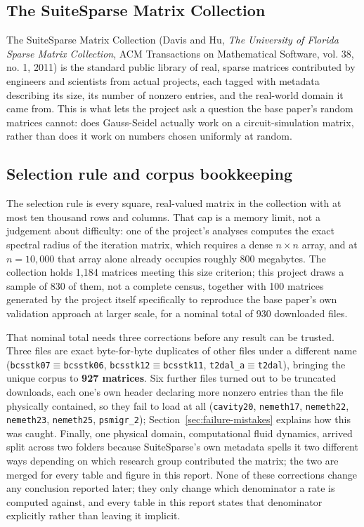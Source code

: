 \documentclass[11pt,a4paper]{article}
\newcommand{\code}[1]{\texttt{\footnotesize #1}}
\begin{document}
\subsection{The SuiteSparse Matrix Collection}
\label{sec:datasets-suitesparse}

The SuiteSparse Matrix Collection (Davis and Hu, \emph{The University of Florida Sparse
Matrix Collection}, ACM Transactions on Mathematical Software, vol. 38, no. 1, 2011) is
the standard public library of real, sparse matrices contributed by engineers and
scientists from actual projects, each tagged with metadata describing its size, its
number of nonzero entries, and the real-world domain it came from. This is what lets the
project ask a question the base paper's random matrices cannot: does Gauss-Seidel
actually work on a circuit-simulation matrix, rather than does it work on numbers chosen
uniformly at random.

\subsection{Selection rule and corpus bookkeeping}
\label{sec:datasets-bookkeeping}

The selection rule is every square, real-valued matrix in the collection with at most ten
thousand rows and columns. That cap is a memory limit, not a judgement about difficulty:
one of the project's analyses computes the exact spectral radius of the iteration matrix,
which requires a dense $n \times n$ array, and at $n = 10{,}000$ that array alone already
occupies roughly 800 megabytes. The collection holds 1{,}184 matrices meeting this size
criterion; this project draws a sample of 830 of them, not a complete census, together
with 100 matrices generated by the project itself specifically to reproduce the base
paper's own validation approach at larger scale, for a nominal total of 930 downloaded
files.

That nominal total needs three corrections before any result can be trusted. Three files
are exact byte-for-byte duplicates of other files under a different name
(\code{bcsstk07}$\equiv$\code{bcsstk06}, \code{bcsstk12}$\equiv$\code{bcsstk11},
\code{t2dal\_a}$\equiv$\code{t2dal}), bringing the unique corpus to \textbf{927 matrices}.
Six further files turned out to be truncated downloads, each one's own header declaring
more nonzero entries than the file physically contained, so they fail to load at all
(\code{cavity20}, \code{nemeth17}, \code{nemeth22}, \code{nemeth23}, \code{nemeth25},
\code{psmigr\_2}); Section~\ref{sec:failure-mistakes} explains how this was caught. Finally,
one physical domain, computational fluid dynamics, arrived split across two folders
because SuiteSparse's own metadata spells it two different ways depending on which
research group contributed the matrix; the two are merged for every table and figure in
this report. None of these corrections change any conclusion reported later; they only
change which denominator a rate is computed against, and every table in this report states
that denominator explicitly rather than leaving it implicit.
\end{document}
